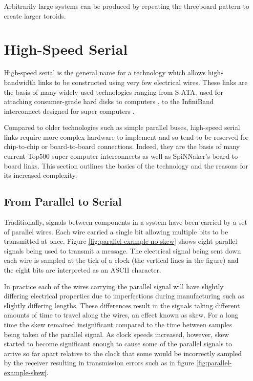 			Arbitrarily large systems can be produced by repeating the threeboard
			pattern to create larger toroids.
	
	\section{High-Speed Serial}
		
		\label{sec:high-speed-serial}
		
		
		High-speed serial is the general name for a technology which allows
		high-bandwidth links to be constructed using very few electrical wires.
		These links are the basis of many widely used technologies ranging from
		S-ATA, used for attaching consumer-grade hard disks to computers
		\cite{sataio}, to the InfiniBand interconnect designed for super computers
		\cite{infinibandta}.
		
		Compared to older technologies such as simple parallel buses, high-speed
		serial links require more complex hardware to implement and so tend to be
		reserved for chip-to-chip or board-to-board connections. Indeed, they are
		the basis of many current Top500 super computer interconnects as well as
		SpiNNaker's board-to-board links. This section outlines the basics of the
		technology and the reasons for its increased complexity.
		
		\subsection{From Parallel to Serial}
			
			Traditionally, signals between components in a system have been carried by
			a set of parallel wires. Each wire carried a single bit allowing multiple
			bits to be transmitted at once. Figure \ref{fig:parallel-example-no-skew}
			shows eight parallel signals being used to transmit a message. The
			electrical signal being sent down each wire is sampled at the tick of a
			clock (the vertical lines in the figure) and the eight bits are
			interpreted as an ASCII character.
			
			In practice each of the wires carrying the parallel signal will have
			slightly differing electrical properties due to imperfections during
			manufacturing such as slightly differing lengths. These differences result
			in the signals taking different amounts of time to travel along the wires,
			an effect known as skew. For a long time the skew remained insignificant
			compared to the time between samples being taken of the parallel signal.
			As clock speeds increased, however, skew started to become significant
			enough to cause some of the parallel signals to arrive so far apart
			relative to the clock that some would be incorrectly sampled by the
			receiver resulting in transmission errors such as in figure
			\ref{fig:parallel-example-skew}.
			

